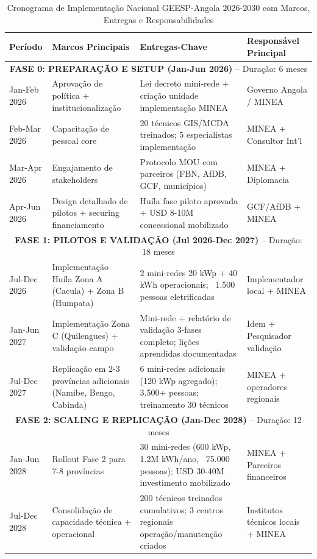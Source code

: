 \documentclass[12pt, a4paper]{article}
\begin{document}
{{{{{{{{{{{{{\begin{table}[H]
\centering
\caption{Cronograma de Implementação Nacional GEESP-Angola 2026-2030 com Marcos, Entregas e Responsabilidades}
\label{tab:timeline_national}
\small
\begin{tabular}{|p{1.2cm}|p{3.2cm}|p{2.8cm}|p{2.5cm}|}
\hline
\textbf{Período} & \textbf{Marcos Principais} & \textbf{Entregas-Chave} & \textbf{Responsável Principal} \\
\hline
\multicolumn{4}{|c|}{\textbf{FASE 0: PREPARAÇÃO E SETUP (Jan-Jun 2026)} -- Duração: 6 meses} \\
\hline
Jan-Feb 2026 & Aprovação de política + institucionalização & Lei decreto mini-rede + criação unidade implementação MINEA & Governo Angola / MINEA \\
\hline
Feb-Mar 2026 & Capacitação de pessoal core & 20 técnicos GIS/MCDA treinados; 5 especialistas implementação & MINEA + Consultor Int'l \\
\hline
Mar-Apr 2026 & Engajamento de stakeholders & Protocolo MOU com parceiros (FBN, AfDB, GCF, municípios) & MINEA + Diplomacia \\
\hline
Apr-Jun 2026 & Design detalhado de pilotos + securing financiamento & Huíla fase piloto aprovada + USD 8-10M concessional mobilizado & GCF/AfDB + MINEA \\
\hline
\multicolumn{4}{|c|}{\textbf{FASE 1: PILOTOS E VALIDAÇÃO (Jul 2026-Dec 2027)} -- Duração: 18 meses} \\
\hline
Jul-Dec 2026 & Implementação Huíla Zona A (Cacula) + Zona B (Humpata) & 2 mini-redes 20 kWp + 40 kWh operacionais; ~1.500 pessoas eletrificadas & Implementador local + MINEA \\
\hline
Jan-Jun 2027 & Implementação Zona C (Quilengues) + validação campo & Mini-rede + relatório de validação 3-fases completo; lições aprendidas documentadas & Idem + Pesquisador validação \\
\hline
Jul-Dec 2027 & Replicação em 2-3 províncias adicionais (Namibe, Bengo, Cabinda) & 6 mini-redes adicionais (120 kWp agregado); 3.500+ pessoas; treinamento 30 técnicos & MINEA + operadores regionais \\
\hline
\multicolumn{4}{|c|}{\textbf{FASE 2: SCALING E REPLICAÇÃO (Jan-Dec 2028)} -- Duração: 12 meses} \\
\hline
Jan-Jun 2028 & Rollout Fase 2 para 7-8 províncias & 30 mini-redes (600 kWp, 1.2M kWh/ano, ~75.000 pessoas); USD 30-40M investimento mobilizado & MINEA + Parceiros financeiros \\
\hline
Jul-Dec 2028 & Consolidação de capacidade técnica + operacional & 200 técnicos treinados cumulativos; 3 centros regionais operação/manutenção criados & Institutos técnicos locais + MINEA \\

\end{tabular}
\end{table}}}}}}}}}}}}}}
\end{document}
